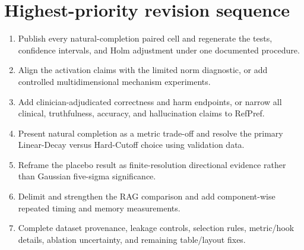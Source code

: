 \documentclass[11pt]{article}
\begin{document}
\section*{Highest-priority revision sequence}

\begin{enumerate}
    \item Publish every natural-completion paired cell and regenerate the tests, confidence intervals, and Holm adjustment under one documented procedure.
    \item Align the activation claims with the limited norm diagnostic, or add controlled multidimensional mechanism experiments.
    \item Add clinician-adjudicated correctness and harm endpoints, or narrow all clinical, truthfulness, accuracy, and hallucination claims to RefPref.
    \item Present natural completion as a metric trade-off and resolve the primary Linear-Decay versus Hard-Cutoff choice using validation data.
    \item Reframe the placebo result as finite-resolution directional evidence rather than Gaussian five-sigma significance.
    \item Delimit and strengthen the RAG comparison and add component-wise repeated timing and memory measurements.
    \item Complete dataset provenance, leakage controls, selection rules, metric/hook details, ablation uncertainty, and remaining table/layout fixes.
\end{enumerate}
\end{document}
